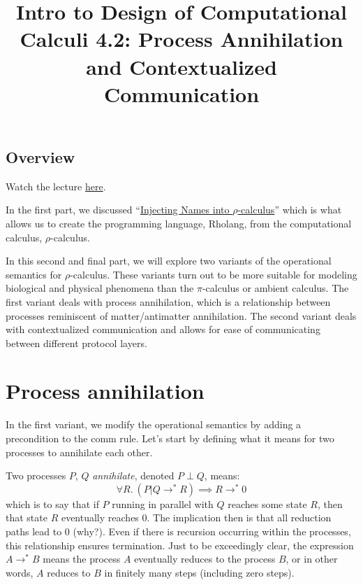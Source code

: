 \documentclass[12pt]{article}
\numberwithin{equation}{section}
\begin{document}
\author{}
\date{}
\title{Intro to Design of Computational Calculi 4.2: Process Annihilation and Contextualized Communication}

\maketitle

\subsection{Overview}
Watch the lecture \href{https://www.youtube.com/watch?v=xGv_DykPNHA \& t=3050s}{here}.

In the first part, we discussed ``\href{}{Injecting Names into $\rho$-calculus}'' which is what allows us to create the programming language, Rholang, from the computational calculus, $\rho$-calculus.

In this second and final part, we will explore two variants of the operational semantics for $\rho$-calculus. These variants turn out to be more suitable for modeling biological and physical phenomena than the $\pi$-calculus or ambient calculus. The first variant deals with process annihilation, which is a relationship between processes reminiscent of matter/antimatter annihilation. The second variant deals with contextualized communication and allows for ease of communicating between different protocol layers.

\section{Process annihilation}
In the first variant, we modify the operational semantics by adding a precondition to the comm rule. Let's start by defining what it means for two processes to annihilate each other.

Two processes $P$, $Q$ \emph{annihilate}, denoted $P \perp Q$, means:
\[ \forall R. \ (P|Q \rightarrow^* R) \implies R \rightarrow^* 0 \]
which is to say that if $P$ running in parallel with $Q$ reaches some state $R$, then that state $R$ eventually reaches 0. The implication then is that all reduction paths lead to 0 (why?). Even if there is recursion occurring within the processes, this relationship ensures termination. Just to be exceedingly clear, the expression $A \rightarrow^* B$ means the process $A$ eventually reduces to the process $B$, or in other words, $A$ reduces to $B$ in finitely many steps (including zero steps).
\end{document}
